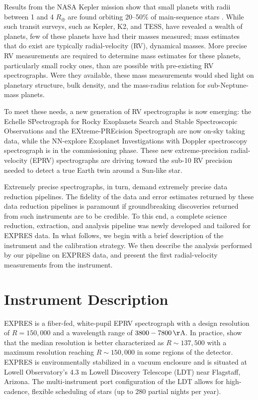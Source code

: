 Results from the NASA Kepler mission show that small planets with radii between 1 and 4 $R_{\oplus}$ are found orbiting 20--50\% of main-sequence stars \citep{winn_occurrence_2015}. While such transit surveys, such as Kepler, K2, and TESS, have revealed a wealth of planets, few of these planets have had their masses measured; mass estimates that do exist are typically radial-velocity (RV), dynamical masses. More precise RV measurements are required to determine mass estimates for these planets, particularly small rocky ones, than are possible with pre-existing RV spectrographs. Were they available, these mass measurements would shed light on planetary structure, bulk density, and the mass-radius relation for sub-Neptune-mass planets. 

To meet these needs, a new generation of RV spectrographs is now emerging: the Echelle SPectrograph for Rocky Exoplanets Search and Stable Spectroscopic Observations \citep[ESPRESSO:][]{pepe_espresso_2013} and the EXtreme-PREcision Spectrograph \citep[EXPRES:][]{jurgenson_expres_2016} are now on-sky taking data, while the NN-explore Exoplanet Investigations with Doppler spectroscopy spectrograph \citep{schwab_design_2016} is in the commissioning phase. These new extreme-precision radial-velocity (EPRV) spectrographs are driving toward the sub-10 \cms RV precision needed to detect a true Earth twin around a Sun-like star.

Extremely precise spectrographs, in turn, demand extremely precise data reduction pipelines. The fidelity of the data and error estimates returned by these data reduction pipelines is paramount if groundbreaking discoveries returned from such instruments are to be credible. To this end, a complete science reduction, extraction, and analysis pipeline was newly developed and tailored for EXPRES data. In what follows, we begin with a brief description of the instrument and the calibration strategy. We then describe the analysis performed by our pipeline on EXPRES data, and present the first radial-velocity measurements from the instrument.

\section{Instrument Description}\label{instrument-description}

EXPRES is a fiber-fed, white-pupil EPRV spectrograph with a design resolution of $R = 150,000$ and a wavelength range of $3800-7800\unit{\AA}$. In practice, \citet{blackman_performance_2020} show that the median resolution is better characterized as $R \sim 137,500$ with a maximum resolution reaching $R \sim 150,000$ in some regions of the detector. EXPRES is environmentally stabilized in a vacuum enclosure and is situated at Lowell Observatory's 4.3 m Lowell Discovery Telescope (LDT) near Flagstaff, Arizona. The multi-instrument port configuration of the LDT allows for high-cadence, flexible scheduling of stars (up to 280 partial nights per year).

